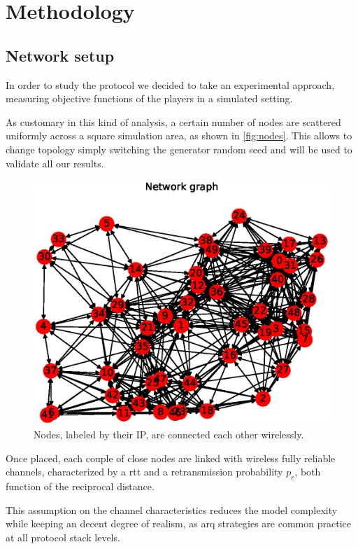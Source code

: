\documentclass[conference]{IEEEtran}
\begin{document}
\section{Methodology}

\subsection{Network setup}

In order to study the protocol we decided to take an experimental approach, measuring objective functions of the players in a simulated setting.

As customary in this kind of analysis, a certain number of nodes are scattered uniformly across a square simulation area, as shown in \autoref{fig:nodes}. This allows to change topology simply switching the generator random seed and will be used to validate all our results.

\begin{figure}[h]
  \centering
  \includegraphics[width=\linewidth]{figures/example_graph}
  \caption{Nodes, labeled by their IP, are connected each other wirelessly.}
  \label{fig:nodes}
\end{figure}

Once placed, each couple of close nodes are linked with wireless fully reliable channels, characterized by a \gls{rtt} and a retransmission probability $p_r$, both function of the reciprocal distance.

This assumption on the channel characteristics reduces the model complexity while keeping an decent degree of realism, as \gls{arq} strategies are common practice at all protocol stack levels.
\end{document}
